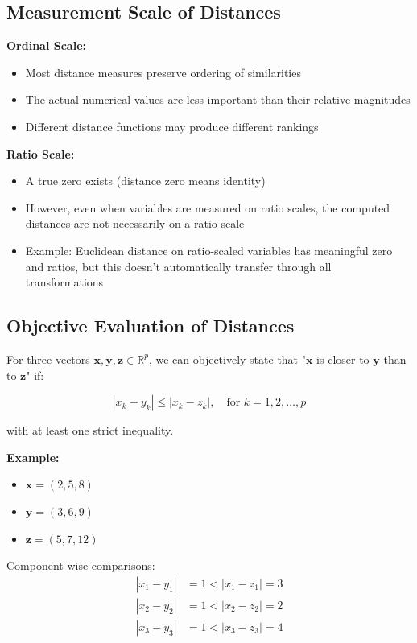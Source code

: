 \documentclass[11pt]{article}
\begin{document}
\subsection{Measurement Scale of Distances}

\textbf{Ordinal Scale:}
\begin{itemize}
    \item Most distance measures preserve ordering of similarities
    \item The actual numerical values are less important than their relative magnitudes
    \item Different distance functions may produce different rankings
\end{itemize}

\textbf{Ratio Scale:}
\begin{itemize}
    \item A true zero exists (distance zero means identity)
    \item However, even when variables are measured on ratio scales, the computed distances are not necessarily on a ratio scale
    \item Example: Euclidean distance on ratio-scaled variables has meaningful zero and ratios, but this doesn't automatically transfer through all transformations
\end{itemize}

\subsection{Objective Evaluation of Distances}

For three vectors $\mathbf{x}, \mathbf{y}, \mathbf{z} \in \mathbb{R}^p$, we can objectively state that "$\mathbf{x}$ is closer to $\mathbf{y}$ than to $\mathbf{z}$" if:

$$|x_k - y_k| \leq |x_k - z_k|, \quad \text{for } k = 1, 2, \ldots, p$$

with at least one strict inequality.

\textbf{Example:}
\begin{itemize}
    \item $\mathbf{x} = (2, 5, 8)$
    \item $\mathbf{y} = (3, 6, 9)$
    \item $\mathbf{z} = (5, 7, 12)$
\end{itemize}

Component-wise comparisons:
\begin{align*}
|x_1 - y_1| &= 1 < |x_1 - z_1| = 3 \\
|x_2 - y_2| &= 1 < |x_2 - z_2| = 2 \\
|x_3 - y_3| &= 1 < |x_3 - z_3| = 4
\end{align*}
\end{document}
